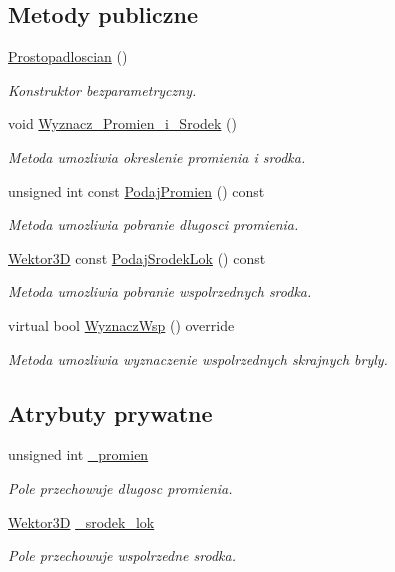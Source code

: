\subsection*{Metody publiczne}
\begin{DoxyCompactItemize}
\item 
\hyperlink{classProstopadloscian_a432b8df2af37ba1a3596f500824eaffe}{Prostopadloscian} ()
\begin{DoxyCompactList}\small\item\em Konstruktor bezparametryczny. \end{DoxyCompactList}\item 
void \hyperlink{classProstopadloscian_a148c8e01a4610bd61081b49789d3bc71}{Wyznacz\+\_\+\+Promien\+\_\+i\+\_\+\+Srodek} ()
\begin{DoxyCompactList}\small\item\em Metoda umozliwia okreslenie promienia i srodka. \end{DoxyCompactList}\item 
unsigned int const \hyperlink{classProstopadloscian_ae6b1528649b6034209ac763cc5881527}{Podaj\+Promien} () const
\begin{DoxyCompactList}\small\item\em Metoda umozliwia pobranie dlugosci promienia. \end{DoxyCompactList}\item 
\hyperlink{classSWektor}{Wektor3D} const \hyperlink{classProstopadloscian_ab9c86b023b990acffe00891c17ee596c}{Podaj\+Srodek\+Lok} () const
\begin{DoxyCompactList}\small\item\em Metoda umozliwia pobranie wspolrzednych srodka. \end{DoxyCompactList}\item 
virtual bool \hyperlink{classProstopadloscian_a9d182fd3d875a1e3928c8972727be6fe}{Wyznacz\+Wsp} () override
\begin{DoxyCompactList}\small\item\em Metoda umozliwia wyznaczenie wspolrzednych skrajnych bryly. \end{DoxyCompactList}\end{DoxyCompactItemize}
\subsection*{Atrybuty prywatne}
\begin{DoxyCompactItemize}
\item 
unsigned int \hyperlink{classProstopadloscian_a06187a64d02fff11fc99e749abcef125}{\+\_\+promien}
\begin{DoxyCompactList}\small\item\em Pole przechowuje dlugosc promienia. \end{DoxyCompactList}\item 
\hyperlink{classSWektor}{Wektor3D} \hyperlink{classProstopadloscian_a3aac0fbd53f5add1fe4e802204e7f609}{\+\_\+srodek\+\_\+lok}
\begin{DoxyCompactList}\small\item\em Pole przechowuje wspolrzedne srodka. \end{DoxyCompactList}\end{DoxyCompactItemize}


